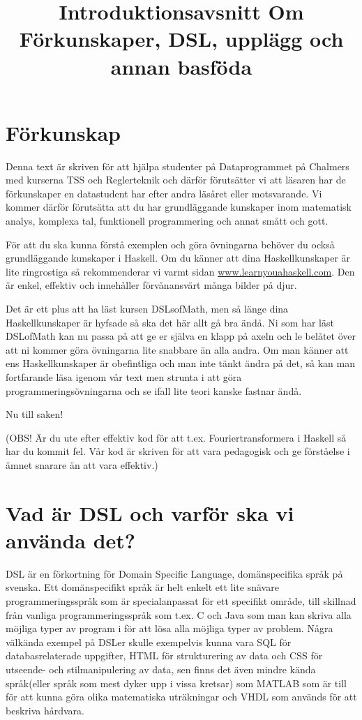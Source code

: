 \documentclass{article}
\title{Introduktionsavsnitt
\large Om Förkunskaper, DSL, upplägg och annan basföda}
\author{}
\date{}
\begin{document}
\maketitle

\section{Förkunskap}

Denna text är skriven för att hjälpa studenter på Dataprogrammet på Chalmers med kurserna TSS och Reglerteknik och därför förutsätter vi att läsaren har de förkunskaper en datastudent har efter andra läsåret eller motsvarande. Vi kommer därför förutsätta att du har grundläggande kunskaper inom matematisk analys, komplexa tal, funktionell programmering och annat smått och gott.

För att du ska kunna förstå exemplen och göra övningarna behöver du också grundläggande kunskaper i Haskell. Om du känner att dina Haskellkunskaper är lite ringrostiga så rekommenderar vi varmt sidan \url{www.learnyouahaskell.com}. Den är enkel, effektiv och innehåller förvånansvärt många bilder på djur.

Det är ett plus att ha läst kursen DSLsofMath, men så länge dina Haskellkunskaper är hyfsade så ska det här allt gå bra ändå. Ni som har läst DSLofMath kan nu passa på att ge er själva en klapp på axeln och le belåtet över att ni kommer göra övningarna lite snabbare än alla andra. Om man känner att ens Haskellkunskaper är obefintliga och man inte tänkt ändra på det, så kan man fortfarande läsa igenom vår text men strunta i att göra programmeringsövningarna och se ifall lite teori kanske fastnar ändå.

Nu till saken!

(OBS! Är du ute efter effektiv kod för att t.ex. Fouriertransformera i Haskell så har du kommit fel. Vår kod är skriven för att vara pedagogisk och ge förståelse i ämnet snarare än att vara effektiv.)

\newpage

\section{Vad är DSL och varför ska vi använda det?}

DSL är en förkortning för Domain Specific Language, domänspecifika språk på svenska. Ett domänspecifikt språk är helt enkelt ett lite snävare programmeringsspråk som är specialanpassat för ett specifikt område, till skillnad från vanliga programmeringsspråk som t.ex. C och Java som man kan skriva alla möjliga typer av program i för att lösa alla möjliga typer av problem. Några välkända exempel på DSLer skulle exempelvis kunna vara SQL för databasrelaterade uppgifter, HTML för strukturering av data och CSS för utseende- och stilmanipulering av data, sen finns det även mindre kända språk(eller språk som mest dyker upp i vissa kretsar) som MATLAB som är till för att kunna göra olika matematiska uträkningar och VHDL som används för att beskriva hårdvara.
\end{document}

